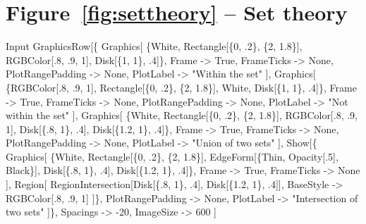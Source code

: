 \documentclass[11pt,fleqn]{book} %
\begin{document}
\section*{Figure~\ref{fig:settheory} -- Set theory }
\small{
\begin{mmaCell}[index=1]{Input}
  GraphicsRow[\{
    Graphics[
      \{White, Rectangle[\{0, .2\}, \{2, 1.8\}], RGBColor[.8, .9, 1], Disk[\{1, 1\}, .4]\}, 
      Frame            -> True, 
      FrameTicks       -> None, 
      PlotRangePadding -> None, 
      PlotLabel        -> "Within the set"
    ],
    Graphics[
      \{RGBColor[.8, .9, 1], Rectangle[\{0, .2\}, \{2, 1.8\}], White, Disk[\{1, 1\}, .4]\}, 
      Frame            -> True, 
      FrameTicks       -> None, 
      PlotRangePadding -> None, 
      PlotLabel        -> "Not within the set"
    ],
    Graphics[
      \{White, Rectangle[\{0, .2\}, \{2, 1.8\}], 
      RGBColor[.8, .9, 1], Disk[\{.8, 1\}, .4], Disk[\{1.2, 1\}, .4]\}, 
      Frame            -> True, 
      FrameTicks       -> None, 
      PlotRangePadding -> None, 
      PlotLabel        -> "Union of two sets"
    ],
    Show[\{
      Graphics[
        \{White, Rectangle[\{0, .2\}, \{2, 1.8\}], 
        EdgeForm[\{Thin, Opacity[.5], Black\}], Disk[\{.8, 1\}, .4], Disk[\{1.2, 1\}, .4]\}, 
        Frame      -> True, 
        FrameTicks -> None
      ],
      Region[
        RegionIntersection[Disk[\{.8, 1\}, .4], Disk[\{1.2, 1\}, .4]], 
        BaseStyle -> RGBColor[.8, .9, 1]
      ]\}, 
      PlotRangePadding -> None, 
      PlotLabel        -> "Intersection of two sets"
    ]\}, 
    Spacings  -> -20, 
    ImageSize -> 600
  ]
\end{mmaCell}
}

\end{document}
